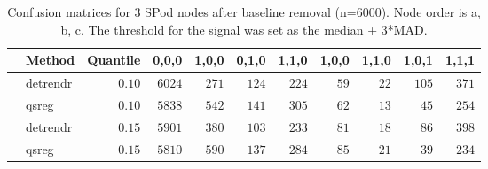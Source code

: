 \begin{table}[!tbp]
\caption{Confusion matrices for 3 SPod nodes after baseline 
      removal (n=6000). Node order is a, b, c. The threshold for the signal was 
      set as the median + 3*MAD.\label{confusion}} 
\begin{center}
\begin{tabular}{llrrrrrrrrr}
\hline\hline
\multicolumn{1}{l}{}&\multicolumn{1}{c}{Method}&\multicolumn{1}{c}{Quantile}&\multicolumn{1}{c}{0,0,0}&\multicolumn{1}{c}{1,0,0}&\multicolumn{1}{c}{0,1,0}&\multicolumn{1}{c}{1,1,0}&\multicolumn{1}{c}{1,0,0}&\multicolumn{1}{c}{1,1,0}&\multicolumn{1}{c}{1,0,1}&\multicolumn{1}{c}{1,1,1}\tabularnewline
\hline
&detrendr&$0.10$&$6024$&$271$&$124$&$224$&$59$&$22$&$105$&$371$\tabularnewline
&qsreg&$0.10$&$5838$&$542$&$141$&$305$&$62$&$13$&$ 45$&$254$\tabularnewline
&detrendr&$0.15$&$5901$&$380$&$103$&$233$&$81$&$18$&$ 86$&$398$\tabularnewline
&qsreg&$0.15$&$5810$&$590$&$137$&$284$&$85$&$21$&$ 39$&$234$\tabularnewline
\hline
\end{tabular}\end{center}
\end{table}
